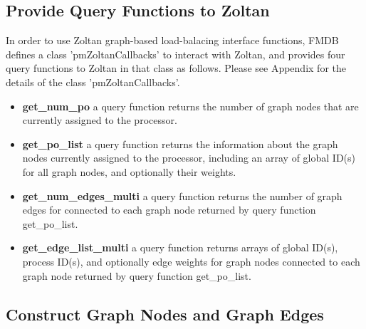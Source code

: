 \subsection{Provide Query Functions to Zoltan}

In order to use Zoltan graph-based load-balacing interface functions,
FMDB defines a class  'pmZoltanCallbacks' to interact with Zoltan, and provides four query
functions to Zoltan in that class as follows. Please see Appendix for
the details of the class  'pmZoltanCallbacks'. 

\begin{itemize}

\item \textbf{get\_num\_po} a query function returns the number of
  graph nodes that are currently assigned to the processor.

  
\item \textbf{get\_po\_list} a query function returns the information about
  the graph nodes  currently assigned to the processor, including an
  array of global ID(s) for all graph nodes,  and optionally
  their weights. 

\item \textbf{get\_num\_edges\_multi} a query function returns the number of
  graph edges for connected to each graph node returned by query
  function get\_po\_list. 

\item \textbf{get\_edge\_list\_multi} a query function returns arrays of global
  ID(s), process ID(s), and optionally edge weights for graph nodes
  connected to each graph node returned by query
  function get\_po\_list. 

\end{itemize}


\subsection{Construct Graph Nodes and Graph Edges}   %
